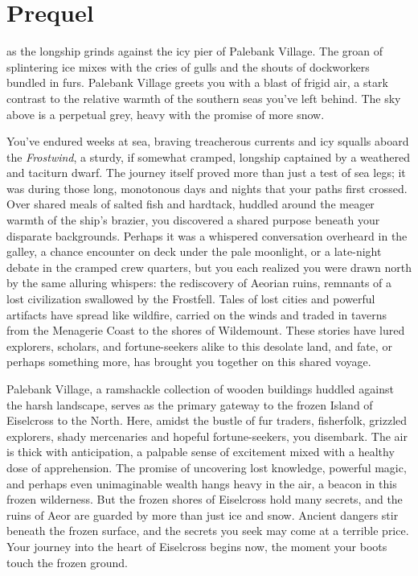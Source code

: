 \documentclass[
  letterpaper,12pt,twoside,twocolumn,openany,
  nodeprecatedcode,bg=full]{dndbook}
\author{}
\date{}
\begin{document}
\chapter{Prequel}\label{prequel}

\hfill\break as the
longship grinds against the icy pier of Palebank Village. The groan of
splintering ice mixes with the cries of gulls and the shouts of
dockworkers bundled in furs. Palebank Village greets you with a blast of
frigid air, a stark contrast to the relative warmth of the southern seas
you've left behind. The sky above is a perpetual grey, heavy with the
promise of more snow.

You've endured weeks at sea, braving treacherous currents and icy
squalls aboard the \emph{Frostwind}, a sturdy, if somewhat cramped,
longship captained by a weathered and taciturn dwarf. The journey itself
proved more than just a test of sea legs; it was during those long,
monotonous days and nights that your paths first crossed. Over shared
meals of salted fish and hardtack, huddled around the meager warmth of
the ship's brazier, you discovered a shared purpose beneath your
disparate backgrounds. Perhaps it was a whispered conversation overheard
in the galley, a chance encounter on deck under the pale moonlight, or a
late-night debate in the cramped crew quarters, but you each realized
you were drawn north by the same alluring whispers: the rediscovery of
Aeorian ruins, remnants of a lost civilization swallowed by the
Frostfell. Tales of lost cities and powerful artifacts have spread like
wildfire, carried on the winds and traded in taverns from the Menagerie
Coast to the shores of Wildemount. These stories have lured explorers,
scholars, and fortune-seekers alike to this desolate land, and fate, or
perhaps something more, has brought you together on this shared voyage.

Palebank Village, a ramshackle collection of wooden buildings huddled
against the harsh landscape, serves as the primary gateway to the frozen
Island of Eiselcross to the North. Here, amidst the bustle of fur
traders, fisherfolk, grizzled explorers, shady mercenaries and hopeful
fortune-seekers, you disembark. The air is thick with anticipation, a
palpable sense of excitement mixed with a healthy dose of apprehension.
The promise of uncovering lost knowledge, powerful magic, and perhaps
even unimaginable wealth hangs heavy in the air, a beacon in this frozen
wilderness. But the frozen shores of Eiselcross hold many secrets, and
the ruins of Aeor are guarded by more than just ice and snow. Ancient
dangers stir beneath the frozen surface, and the secrets you seek may
come at a terrible price. Your journey into the heart of Eiselcross
begins now, the moment your boots touch the frozen ground.
\end{document}
